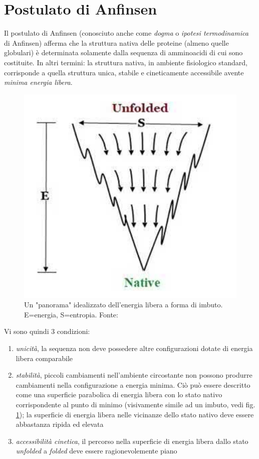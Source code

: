 \section{Postulato di Anfinsen}
{
Il postulato di Anfinsen (conosciuto anche come \textit{dogma} o \textit{ipotesi termodinamica} di Anfinsen) afferma che la struttura nativa delle proteine (almeno quelle globulari) è determinata solamente dalla sequenza di amminoacidi di cui sono costituite. In altri termini: la struttura nativa, in ambiente fisiologico standard, corrisponde a quella struttura unica, stabile e cineticamente accessibile avente \textit{minima energia libera}. 

\begin{figure}[h]
	\centering
	\includegraphics[scale=0.3]{images/funnel-folding.png}
	\caption{Un "panorama" idealizzato dell'energia libera a forma di imbuto. E=energia, S=entropia. Fonte: \cite{pal2019fundamentals}}
	\label{fig:funnel}
\end{figure}

Vi sono quindi 3 condizioni:

\begin{enumerate}
	\item \textit{unicità}, la sequenza non deve possedere altre configurazioni dotate di energia libera comparabile
	\item \textit{stabilità}, piccoli cambiamenti nell'ambiente circostante non possono produrre cambiamenti nella configurazione a energia minima. Ciò può essere descritto come una superficie parabolica di energia libera con lo stato nativo corrispondente al punto di minimo (visivamente simile ad un imbuto, vedi fig. \ref{fig:funnel}); la superficie di energia libera nelle vicinanze dello stato nativo deve essere abbastanza ripida ed elevata
	\item \textit{accessibilità cinetica}, il percorso nella superficie di energia libera dallo stato \textit{unfolded} a \textit{folded} deve essere ragionevolemente piano
\end{enumerate}


}
